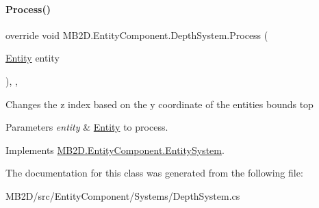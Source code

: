 \paragraph{\texorpdfstring{Process()}{Process()}}
{\footnotesize\ttfamily override void M\+B2\+D.\+Entity\+Component.\+Depth\+System.\+Process (\begin{DoxyParamCaption}\item[{\hyperlink{class_m_b2_d_1_1_entity_component_1_1_entity}{Entity}}]{entity }\end{DoxyParamCaption})\hspace{0.3cm}{\ttfamily [inline]}, {\ttfamily [protected]}, {\ttfamily [virtual]}}



Changes the z index based on the y coordinate of the entities bounds top 


\begin{DoxyParams}{Parameters}
{\em entity} & \hyperlink{class_m_b2_d_1_1_entity_component_1_1_entity}{Entity} to process.\\
\hline
\end{DoxyParams}


Implements \hyperlink{class_m_b2_d_1_1_entity_component_1_1_entity_system_abbf83b87cb5d12754fb058cef50451fa}{M\+B2\+D.\+Entity\+Component.\+Entity\+System}.



The documentation for this class was generated from the following file\+:\begin{DoxyCompactItemize}
\item 
M\+B2\+D/src/\+Entity\+Component/\+Systems/Depth\+System.\+cs\end{DoxyCompactItemize}
